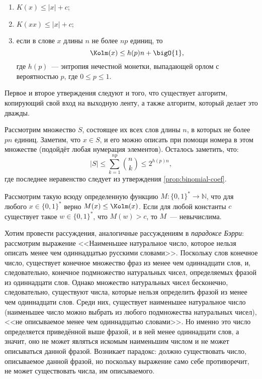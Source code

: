 \begin{enumerate}
    \item $K(x) \le |x| + c$;
    \item $K(xx) \le |x| + c$;
    \item если в слове $x$ длины $n$ не более $np$ единиц, то
        $$
            \Kolm(x) \le h(p) n + \bigO{1},
        $$ 
        где $h(p)$~--- энтропия нечестной монетки, выпадающей орлом с вероятностью $p$, где $0 \le p \le
        1$.
\end{enumerate}

Первое и второе утверждения следуют и того, что существует алгоритм, копирующий свой вход на выходную
ленту, а также алгоритм, который делает это дважды.

Рассмотрим множество $S$, состоящее их всех слов длины $n$, в которых не более $pn$ единиц. Заметим, что
$x \in S$, и его можно описать при помощи номера в этом множестве (подойдёт любая нумерация
элементов). Осталось заметить, что:
$$
    |S| \le \sum_{k = 1}^{np} \binom{n}{k} \leq 2^{h(p) n},
$$
где последнее неравенство следует из утверждения \ref{prop:binomial-coef}.


\begin{theorem}
    Рассмотрим такую всюду определенную функцию $M\colon \{0, 1\}^{*} \to \mathbb{N}$, что для любого $x
    \in \{0, 1\}^{*}$ верно $M(x) \le \Kolm(x)$. Если для любой константы $c$ существует такое
    $w \in \{0, 1\}^{*}$, что $M(w) > c$, то $M$~--- невычислима.
\end{theorem}

Хотим провести рассуждения, аналогичные рассуждениям в \textit{парадоксе Бэрри}: рассмотрим выражение
<<Наименьшее натуральное число, которое нельзя описать менее чем одиннадцатью русскими
словами>>. Поскольку слов конечное число, существует конечное множество фраз из менее чем одиннадцати
слов, и, следовательно, конечное подмножество натуральных чисел, определяемых фразой из одиннадцати
слов. Однако множество натуральных чисел бесконечно, следовательно, существуют числа, которые нельзя
определить фразой из менее чем одиннадцати слов. Среди них, существует наименьшее натуральное число
(наименьшее число можно выбрать из любого подмножества натуральных чисел), <<не описываемое менее чем
одиннадцатью словами>>. Но именно это число определяется приведённой выше фразой, и в ней менее
одиннадцати слов, а значит, оно не может являться искомым наименьшим числом и не может описываться данной
фразой. Возникает парадокс: должно существовать число, описываемое данной фразой, но поскольку выражение
само себе противоречит, не может существовать числа, им описываемого.
    
